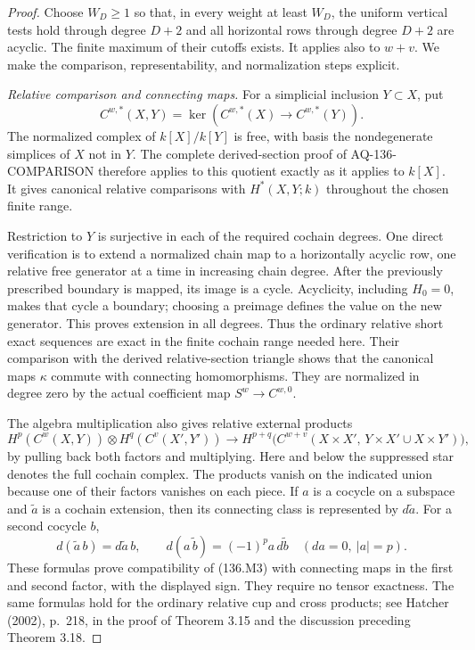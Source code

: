 \begin{proof}
Choose $W_D\ge1$ so that, in every weight at least $W_D$,
the uniform vertical tests hold through degree $D+2$
and all horizontal rows through degree $D+2$ are acyclic.
The finite maximum of their cutoffs exists. It applies
also to $w+v$. We make the comparison, representability,
and normalization steps explicit.

\emph{Relative comparison and connecting maps.}
For a simplicial inclusion $Y\subset X$, put
\[
 C^{w,*}(X,Y)=\ker(C^{w,*}(X)\longrightarrow C^{w,*}(Y)).
\]
The normalized complex of $k[X]/k[Y]$ is free, with
basis the nondegenerate simplices of $X$ not in $Y$.
The complete derived-section proof of AQ-136-COMPARISON
therefore applies to this quotient exactly as it applies
to $k[X]$. It gives canonical relative comparisons with
$H^*(X,Y;k)$ throughout the chosen finite range.

Restriction to $Y$ is surjective in each of the required
cochain degrees. One direct verification is to extend
a normalized chain map to a horizontally acyclic row,
one relative free generator at a time in increasing
chain degree. After the previously prescribed boundary
is mapped, its image is a cycle. Acyclicity, including
$H_0=0$, makes that cycle a boundary; choosing a
preimage defines the value on the new generator.
This proves extension in all degrees. Thus the ordinary
relative short exact sequences are exact in the finite
cochain range needed here. Their comparison with the
derived relative-section triangle shows that the
canonical maps $\kappa$ commute with connecting
homomorphisms. They are normalized in degree zero by
the actual coefficient map $S^w\to C^{w,0}$.

The algebra multiplication also gives relative external
products
\[
 H^p(C^w(X,Y))\otimes H^q(C^v(X',Y'))
 \longrightarrow H^{p+q}
 \bigl(C^{w+v}(X\times X',\,
                Y\times X'\cup X\times Y')\bigr),
                                                               \tag{136.M3}
\]
by pulling back both factors and multiplying. Here and
below the suppressed star denotes the full cochain
complex. The products vanish on the indicated union
because one of their factors vanishes on each piece.
If $a$ is a cocycle on a subspace and $\widetilde a$
is a cochain extension, then its connecting class is
represented by $d\widetilde a$. For a second cocycle $b$,
\[
 d(\widetilde a\,b)=d\widetilde a\,b,
   \qquad
 d(a\,\widetilde b)=(-1)^p a\,d\widetilde b
                  \quad (da=0,\ |a|=p).
                                                               \tag{136.M4}
\]
These formulas prove compatibility of (136.M3) with
connecting maps in the first and second factor, with
the displayed sign. They require no tensor exactness.
The same formulas hold for the ordinary relative cup
and cross products; see Hatcher (2002), p.~218, in
the proof of Theorem 3.15 and the discussion preceding
Theorem 3.18.


\end{proof}
